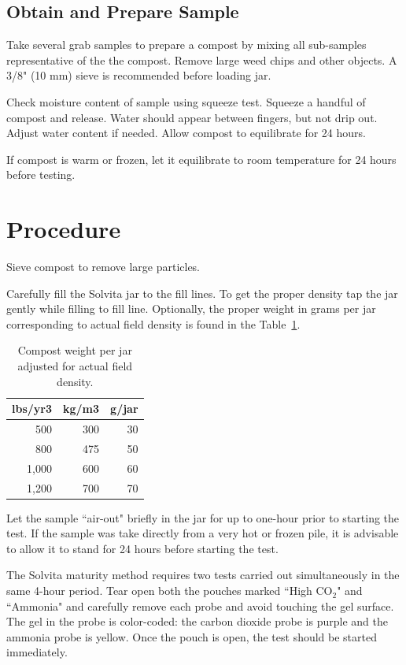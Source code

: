 \documentclass[12pt]{../SOP4_alpha}\usepackage[]{graphicx}\usepackage[]{xcolor}
\begin{document}
\subsection{Obtain and Prepare Sample}

\NP Take several grab samples to prepare a compost by mixing all sub-samples representative of the the compost. Remove large weed chips and other objects. A 3/8" (10 mm) sieve is recommended before loading jar.

\NP Check moisture content of sample using squeeze test. Squeeze a handful of compost and release. Water should appear between fingers, but not drip out. Adjust water content if needed. Allow compost to equilibrate for 24 hours.

\NP If compost is warm or frozen, let it equilibrate to room temperature for 24 hours before testing.

\section{Procedure}

\NP Sieve compost to remove large particles.

\NP Carefully fill the Solvita jar to the fill lines. To get the proper density tap the jar gently while filling to fill line. Optionally, the proper weight in grams per jar corresponding to actual field density is found in the Table~\ref{tab:jarweight}.

\begin{table}[ht]
\caption{Compost weight per jar adjusted for actual field density.}
\label{tab:jarweight}
\centering
\begin{tabular}{rrr}
  \hline
 \textbf{lbs/yr3} & \textbf{kg/m3} & \textbf{g/jar} \\ 
  \hline \hline
  500   & 300   & 30 \\
  800   & 475   & 50 \\
  1,000 & 600   & 60 \\
  1,200 & 700   & 70 \\ \hline
\end{tabular}
\end{table}


\NP Let the sample ``air-out" briefly in the jar for up to one-hour prior to starting the test. If the sample was take directly from a very hot or frozen pile, it is advisable to allow it to stand for 24 hours before starting the test. 

\NP The Solvita maturity method requires two tests carried out simultaneously in the same 4-hour period. Tear open both the pouches marked ``High CO$_2$" and ``Ammonia" and carefully remove each probe and avoid touching the gel surface. The gel in the probe is color-coded: the carbon dioxide probe is purple and the ammonia probe is yellow. Once the pouch is open, the test should be started immediately. 
\end{document}
